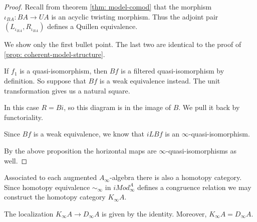 \documentclass[../thesis.tex]{subfiles}
\begin{document}
            \begin{proof}
                Recall from theorem \ref{thm: model-comod} that the morphism $\iota_{BA} : BA \to UA$ is an acyclic twisting morphism. Thus the adjoint pair $(L_{\iota_{BA}}, R_{\iota_{BA}})$ defines a Quillen equivalence.

                We show only the first bullet point. The last two are identical to the proof of \ref{prop: coherent-model-structure}.

                If $f_1$ is a quasi-isomorphism, then $Bf$ is a filtered quasi-isomorphism by definition. So suppose that $Bf$ is a weak equivalence instead. The unit transformation gives us a natural square.

                \begin{center}
                \end{center}

                In this case $R = Bi$, so this diagram is in the image of $B$. We pull it back by functoriality.

                \begin{center}
                \end{center}

                Since $Bf$ is a weak equivalence, we know that $iLBf$ is an $\infty$-quasi-isomorphism.

                By the above proposition the horizontal maps are $\infty$-quasi-isomorphisms as well.
            \end{proof}

            Associated to each augmented $A_\infty$-algebra there is also a homotopy category. Since homotopy equivalence $\sim_\infty$ in $iMod_\infty^A$ defines a congruence relation we may construct the homotopy category $K_\infty A$.

            \begin{corollary}
                The localization $K_\infty A \to D_\infty A$ is given by the identity. Moreover, $K_\infty A = D_\infty A$.
            \end{corollary}
\end{document}
